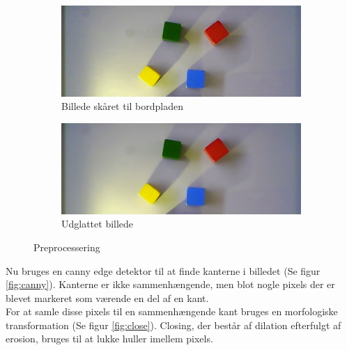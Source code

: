 \begin{figure}[H]
	\centering
	\begin{subfigure}{.45\textwidth}
		\centering
		\includegraphics[scale=0.3]{images/cropped}
		\caption{Billede skåret til bordpladen}
		\label{fig:cropped}
	\end{subfigure}
	\begin{subfigure}{.45\textwidth}
		\centering
		\includegraphics[scale=0.3]{images/smooth}
		\caption{Udglattet billede}
		\label{fig:smooth}
	\end{subfigure}
	\caption{Preprocessering}
	\label{fig:preprocessing}
\end{figure}


Nu bruges en canny edge detektor til at finde kanterne i billedet (Se figur \ref{fig:canny}).
Kanterne er ikke sammenhængende, men blot nogle pixels der er blevet markeret som værende en del af en kant. \\

For at samle disse pixels til en sammenhængende kant bruges en morfologiske transformation (Se figur \ref{fig:close}).
Closing, der består af dilation efterfulgt af erosion, bruges til at lukke huller imellem pixels. \\

